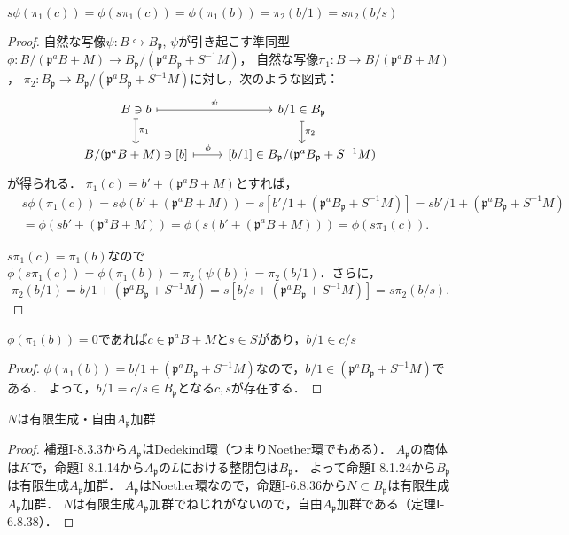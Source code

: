 \begin{screen}
  $s\phi(\pi_1(c)) = \phi(s\pi_1(c)) = \phi(\pi_1(b)) = \pi_2(b/1) = s\pi_2(b/s)$
\end{screen}
\begin{proof}
  自然な写像$\psi\colon B\hookrightarrow B_\mathfrak{p}$, $\psi$が引き起こす準同型$\phi\colon B/(\mathfrak{p}^aB + M)\to B_\mathfrak{p}/(\mathfrak{p}^aB_\mathfrak{p} + S^{-1}M)$，
  自然な写像$\pi_1\colon B\to B/(\mathfrak{p}^aB + M)$，
  $\pi_2\colon B_\mathfrak{p}\to B_\mathfrak{p}/(\mathfrak{p}^aB_\mathfrak{p} + S^{-1}M)$に対し，次のような図式：
  \[
  \begin{tikzcd}
    B \ni b \arrow[r, "\psi", mapsto]\arrow[d, "\pi_1", mapsto] & b/1\in B_\mathfrak{p}\arrow[d, "\pi_2", mapsto] \\
    B/(\mathfrak{p}^aB + M) \ni [b] \arrow[r, "\phi", mapsto] & {[b/1]}\in B_\mathfrak{p}/(\mathfrak{p}^aB_\mathfrak{p} + S^{-1}M)
  \end{tikzcd}
  \]
  が得られる．
  $\pi_1(c) = b' + (\mathfrak{p}^aB + M)$とすれば，
  \begin{align*}
    & s\phi(\pi_1(c)) = s\phi(b' + (\mathfrak{p}^aB + M)) = s[b'/1 + (\mathfrak{p}^aB_\mathfrak{p} + S^{-1}M)] = sb'/1 + (\mathfrak{p}^aB_\mathfrak{p} + S^{-1}M) \\
    & =  \phi(sb' + (\mathfrak{p}^aB + M)) = \phi(s(b' + (\mathfrak{p}^aB + M))) = \phi(s\pi_1(c)).
  \end{align*}

  $s\pi_1(c) = \pi_1(b)$なので$\phi(s\pi_1(c)) = \phi(\pi_1(b)) = \pi_2(\psi(b)) = \pi_2(b/1)$．さらに，
  \[\pi_2(b/1) = b/1 + (\mathfrak{p}^aB_\mathfrak{p} + S^{-1}M) = s[b/s + (\mathfrak{p}^aB_\mathfrak{p} + S^{-1}M)] = s\pi_2(b/s).\]
\end{proof}

\begin{screen}
  $\phi(\pi_1(b)) = 0$であれば$c\in\mathfrak{p}^aB + M$と$s\in S$があり，$b/1\in c/s$
\end{screen}
\begin{proof}
  $\phi(\pi_1(b)) = b/1 + (\mathfrak{p}^aB_\mathfrak{p} + S^{-1}M)$なので，$b/1\in(\mathfrak{p}^aB_\mathfrak{p} + S^{-1}M)$である．
  よって，$b/1 = c/s\in B_\mathfrak{p}$となる$c, s$が存在する．
\end{proof}

\begin{screen}
  $N$は有限生成・自由$A_\mathfrak{p}$加群
\end{screen}
\begin{proof}
  補題I-8.3.3から$A_\mathfrak{p}$はDedekind環（つまりNoether環でもある）．
  $A_\mathfrak{p}$の商体は$K$で，命題I-8.1.14から$A_\mathfrak{p}$の$L$における整閉包は$B_\mathfrak{p}$．
  よって命題I-8.1.24から$B_\mathfrak{p}$は有限生成$A_\mathfrak{p}$加群．
  $A_\mathfrak{p}$はNoether環なので，命題I-6.8.36から$N\subset B_\mathfrak{p}$は有限生成$A_\mathfrak{p}$加群．
  $N$は有限生成$A_\mathfrak{p}$加群でねじれがないので，自由$A_\mathfrak{p}$加群である（定理I-6.8.38）．
\end{proof}

